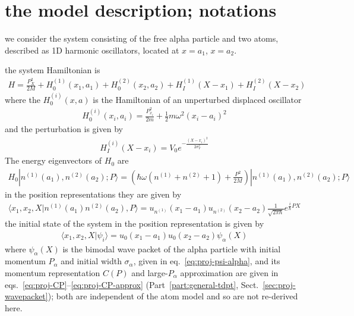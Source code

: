 \section{the model description; notations}
\label{sec:osc-two-absorber}
we consider the system consisting of the free alpha particle and two atoms, described as 1D harmonic oscillators, located at $x=a_1$, $x=a_2$.

the system Hamiltonian is
\begin{align}
  H=\frac{P_X^2}{2M}+H^{(1)}_0(x_1, a_1)+H^{(2)}_0(x_2, a_2)+H_I^{(1)}(X-x_1)+H_I^{(2)}(X-x_2)
\end{align}
where the $H^{(i)}_0(x,a)$ is the Hamiltonian of an unperturbed displaced oscillator
\begin{align}
  H^{(i)}_0(x_i,a_i)=\frac{P_{x_i}^2}{2m}+\frac{1}{2}m\omega^2(x_i-a_i)^2
\end{align}
and the perturbation is given by
\begin{align}
  H_I^{(i)}(X-x_i)=V_0e^{-\frac{(X-x_i)^2}{2\sigma_V^2}}
\end{align}
The energy eigenvectors of $H_0$ are
\begin{align}
  H_0|n^{(1)}(a_1),n^{(2)}(a_2);P\rangle = (\hbar\omega(n^{(1)}+n^{(2)}+1)+\frac{P^2}{2M})|n^{(1)}(a_1),n^{(2)}(a_2);P\rangle
\end{align}
in the position representations they are given by
\begin{align}
  \langle x_1,x_2,X|n^{(1)}(a_1)n^{(2)}(a_2),P\rangle = u_{n^{(1)}}(x_1-a_1)u_{n^{(2)}}(x_2-a_2)\frac{1}{\sqrt{2\pi\hbar}}e^{\frac{i}{\hbar}PX}
\end{align}
the initial state of the system in the position representation is given by
\begin{align}
  \langle x_1,x_2,X|\psi_i\rangle = u_0(x_1-a_1)u_0(x_2-a_2) \psi_\alpha(X)
\end{align}
where $\psi_\alpha(X)$ is the bimodal wave packet of the alpha particle with initial momentum $P_\alpha$ and initial width $\sigma_\alpha$, given in eq.~\eqref{eq:proj-psi-alpha}, and its momentum representation $C(P)$ and large-$P_\alpha$ approximation are given in eqs.~\eqref{eq:proj-CP}--\eqref{eq:proj-CP-approx} (Part~\ref{part:general-tdpt}, Sect.~\ref{sec:proj-wavepacket}); both are independent of the atom model and so are not re-derived here.
